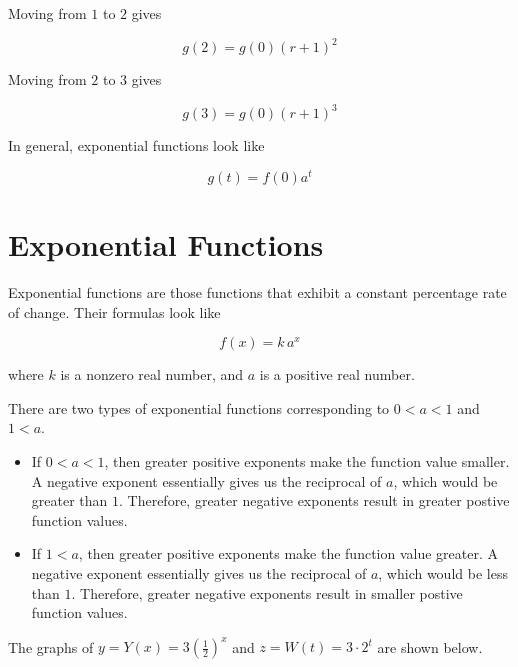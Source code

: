 \documentclass{ximera}
\begin{document}
Moving from $1$ to $2$ gives

\[      g(2) =  g(0) (r + 1)^2  \]


Moving from $2$ to $3$ gives

\[      g(3) =  g(0) (r + 1)^3  \]


In general, exponential functions look like


\[      g(t) = f(0) a^t   \]



\section{Exponential Functions}


\begin{definition}

Exponential functions are those functions that exhibit a constant percentage rate of change.  Their formulas look like


\[      f(x) = k \, a^x   \]

where $k$ is a nonzero real number, and $a$ is a positive real number.


\end{definition}


There are two types of exponential functions corresponding to $0<a<1$ and $1<a$.






\begin{itemize}
\item If $0<a<1$, then greater positive exponents make the function value smaller.   A negative exponent essentially gives us the reciprocal of $a$, which would be greater than $1$.  Therefore, greater negative exponents result in greater postive function values.
\item If $1<a$, then greater positive exponents make the function value greater.   A negative exponent essentially gives us the reciprocal of $a$, which would be less than $1$.  Therefore, greater negative exponents result in smaller postive function values.
\end{itemize}



The graphs of $y = Y(x) = 3 \left(\frac{1}{2}\right)^x$ and $z = W(t) = 3 \cdot 2^t$ are shown below.
\end{document}
